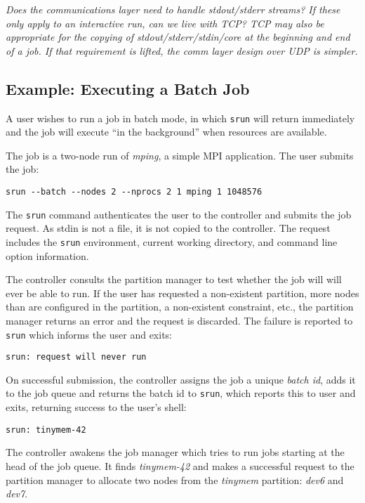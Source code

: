 {\em Does the communications layer need to handle stdout/stderr streams?
If these only apply to an interactive run, can we live with TCP?
TCP may also be appropriate for the copying of stdout/stderr/stdin/core
at the beginning and end of a job.  If that requirement is lifted,
the comm layer design over UDP is simpler.}

\subsection{Example:  Executing a Batch Job}

A user wishes to run a job in batch mode, in which {\tt srun} will return 
immediately and the job will execute ``in the background'' when resources
are available.

The job is a two-node run of {\em mping}, a simple MPI application.
The user submits the job:
\begin{verbatim}
srun --batch --nodes 2 --nprocs 2 1 mping 1 1048576
\end{verbatim}

The {\tt srun} command authenticates the user to the controller and submits
the job request.  As stdin is not a file, it is not copied to the controller.
The request includes the {\tt srun} environment, current working directory, 
and command line option information.

The controller consults the partition manager to test whether the job will
will ever be able to run.  If the user has requested a non-existent partition,
more nodes than are configured in the partition, a non-existent constraint, 
etc., the partition manager returns an error and the request is discarded.
The failure is reported to {\tt srun} which informs the user and exits:
\begin{verbatim}
srun: request will never run
\end{verbatim}

On successful submission, the controller assigns the job a unique 
{\em batch id}, adds it to the job queue and returns the 
batch id to {\tt srun}, which reports this to user and exits, returning
success to the user's shell:

\begin{verbatim}
srun: tinymem-42
\end{verbatim}

The controller awakens the job manager which tries to run
jobs starting at the head of the job queue.  It finds {\em tinymem-42}
and makes a successful request to the partition manager to allocate 
two nodes from the {\em tinymem} partition: {\em dev6} and {\em dev7}.

